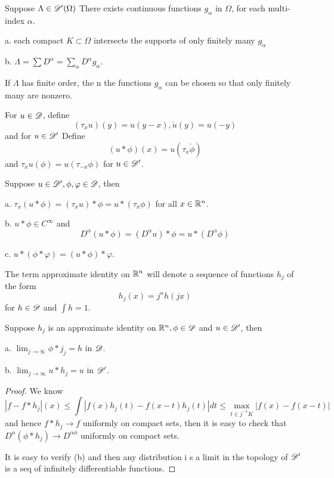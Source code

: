 \begin{theorem}
    Suppose $\Lambda \in \mathscr{D}'(\Omega)$ There exists continuous functions $g_{\alpha}$ in $\Omega$, for each multi-index $\alpha$.\par
    a. each compact $K\subset \Omega$ intersects the supports of only finitely many $g_{\alpha}$\par
    b. $\Lambda = \sum D^{\alpha} = \sum_{\alpha} D^{\alpha}g_{\alpha}$.\par
    If $\Lambda$ has finite order, the n the functions $g_{\alpha}$ can be chosen so that only finitely many are nonzero.
\end{theorem}

\begin{definition}
    For $u\in \mathscr{D}$, define
    \[
    (\tau_x u)(y) = u(y-x), \check{u}(y) = u(-y) 
    \]
    and for $u \in \mathscr{D}'$ Define
    \[
    (u*\phi)(x) = u(\tau_x\check{\phi})
    \]
    and $\tau_x u(\phi) = u(\tau_{-x}\phi)$ for $u\in\mathscr{D}'$.
\end{definition}

\begin{theorem}
    Suppose $u\in\mathscr{D}',\phi,\varphi\in\mathscr{D}$, then\par
    a. $\tau_x(u*\phi) = (\tau_xu)*\phi = u*(\tau_x\phi)$ for all $x\in \mathbb{R}^n$.\par
    b. $u*\phi \in C^{\infty}$ and
    \[D^{\alpha}(u*\phi) = (D^{\alpha} u)*\phi = u*(D^{\alpha} \phi)\]\par
    c. $u*(\phi*\varphi) = (u*\phi)*\varphi$.
\end{theorem}

\begin{definition}
    The term approximate identity on $\mathbb{R}^n$ will denote a sequence of functions $h_j$ of the form
    \[h_j(x) = j^nh(jx)\]
    for $h\in \mathscr{D}$ and $\int h = 1$.
\end{definition}

\begin{theorem}
    Suppose $h_j$ is an approximate identity on $\mathbb{R}^n, \phi \in \mathscr{D}$ and $u\in \mathscr{D}'$, then\par
    a. $\lim_{j\to\infty} \phi*j_j = h$ in $\mathscr{D}$.\par
    b. $\lim_{j\to\infty} u*h_j = u$ in $\mathscr{D}'$.
\end{theorem}
\begin{proof}
    We know
    \[
    |f-f*h_j|(x) \leq \int |f(x)h_j(t)-f(x-t)h_j(t)|dt \leq \max_{t\in j^{-1}K}|f(x) - f(x-t)| 
    \]
    and hence $f*h_j \to f$ uniformly on compact sets, then it is easy to check that $D^{\alpha}(\phi*h_j) \to D^{\alpha \phi}$ uniformly on compact sets.\par
    It is easy to verify (b) and then any distribution i s a limit in the topology of $\mathscr{D}'$ is a seq of infinitely differentiable functions.
\end{proof}

